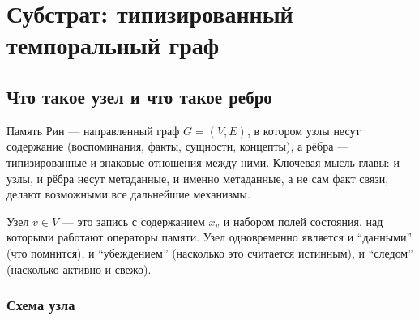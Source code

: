 \chapter{Субстрат: типизированный темпоральный граф}
\label{ch:substrate}

\section{Что такое узел и что такое ребро}

Память Рин --- направленный граф $G = (V, E)$, в котором узлы несут содержание
(воспоминания, факты, сущности, концепты), а рёбра --- типизированные и
знаковые отношения между ними. Ключевая мысль главы: и узлы, и рёбра несут
метаданные, и именно метаданные, а не сам факт связи, делают возможными все
дальнейшие механизмы.

\begin{definition}
Узел $v \in V$ --- это запись с содержанием $x_v$ и набором полей состояния,
над которыми работают операторы памяти. Узел одновременно является и
``данными'' (что помнится), и ``убеждением'' (насколько это считается
истинным), и ``следом'' (насколько активно и свежо).
\end{definition}

\subsection{Схема узла}

